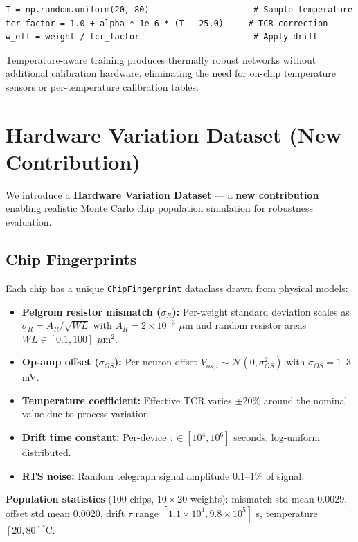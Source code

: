 \documentclass[10pt,twocolumn]{article}
\begin{document}
\begin{verbatim}
T = np.random.uniform(20, 80)                     # Sample temperature
tcr_factor = 1.0 + alpha * 1e-6 * (T - 25.0)     # TCR correction
w_eff = weight / tcr_factor                       # Apply drift
\end{verbatim}

Temperature-aware training produces thermally robust networks without additional calibration hardware, eliminating the need for on-chip temperature sensors or per-temperature calibration tables.

\section{Hardware Variation Dataset (New Contribution)}

We introduce a \textbf{Hardware Variation Dataset} --- a \textbf{new contribution} enabling realistic Monte Carlo chip population simulation for robustness evaluation.

\subsection{Chip Fingerprints}

Each chip has a unique \texttt{ChipFingerprint} dataclass drawn from physical models:
\begin{itemize}
  \item \textbf{Pelgrom resistor mismatch ($\sigma_R$):} Per-weight standard deviation scales as $\sigma_R = A_R / \sqrt{WL}$ with $A_R = 2 \times 10^{-3}$ $\mu$m and random resistor areas $WL \in [0.1, 100]$ $\mu$m$^2$.
  \item \textbf{Op-amp offset ($\sigma_{OS}$):} Per-neuron offset $V_{os,i} \sim \mathcal{N}(0, \sigma_{OS}^2)$ with $\sigma_{OS} = 1$--$3$ mV.
  \item \textbf{Temperature coefficient:} Effective TCR varies $\pm 20\%$ around the nominal value due to process variation.
  \item \textbf{Drift time constant:} Per-device $\tau \in [10^4, 10^6]$ seconds, log-uniform distributed.
  \item \textbf{RTS noise:} Random telegraph signal amplitude 0.1--1\% of signal.
\end{itemize}

\textbf{Population statistics} (100 chips, $10 \times 20$ weights): mismatch std mean $0.0029$, offset std mean $0.0020$, drift $\tau$ range $[1.1 \times 10^4, 9.8 \times 10^5]$ s, temperature $[20, 80]^\circ$C.
\end{document}
